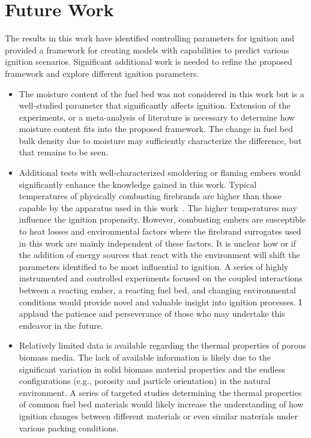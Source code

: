 
\chapter{Future Work}
\label{chap:futureWork}

  The results in this work have identified controlling parameters for ignition and provided a framework for creating models with capabilities to predict various ignition scenarios. Significant additional work is needed to refine the proposed framework and explore different ignition parameters. 
        \begin{itemize}
            \item The moisture content of the fuel bed was not considered in this work but is a well-studied parameter that significantly affects ignition. Extension of the experiments, or a meta-analysis of literature is necessary to determine how moisture content fits into the proposed framework. The change in fuel bed bulk density due to moisture may sufficiently characterize the difference, but that remains to be seen.
            
            \item Additional tests with well-characterized smoldering or flaming embers would significantly enhance the knowledge gained in this work. Typical temperatures of physically combusting firebrands are higher than those capable by the apparatus used in this work~\cite{Fateev2017a}. The higher temperatures may influence the ignition propensity. However, combusting embers are susceptible to heat losses and environmental factors where the firebrand surrogates used in this work are mainly independent of these factors. It is unclear how or if the addition of energy sources that react with the environment will shift the parameters identified to be most influential to ignition. A series of highly instrumented and controlled experiments focused on the coupled interactions between a reacting ember, a reacting fuel bed, and changing environmental conditions would provide novel and valuable insight into ignition processes. I applaud the patience and perseverance of those who may undertake this endeavor in the future. 
            
            \item Relatively limited data is available regarding the thermal properties of porous biomass media. The lack of available information is likely due to the significant variation in solid biomass material properties and the endless configurations (e.g., porosity and particle orientation) in the natural environment. A series of targeted studies determining the thermal properties of common fuel bed materials would likely increase the understanding of how ignition changes between different materials or even similar materials under various packing conditions.
            

\end{itemize}
